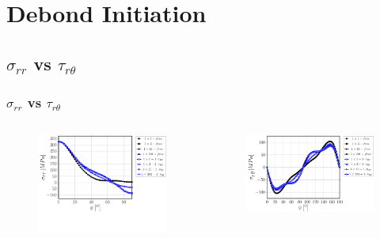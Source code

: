 \documentclass[first,firstsupp,lastsupp,last,hyperref,table]{ETHclass}
\begin{document}
\section{Debond Initiation}

\subsection{$\sigma_{rr}$ vs $\tau_{r\theta}$}

\begin{frame}
\frametitle{\vspace{0.2cm}\small $\sigma_{rr}$ vs $\tau_{r\theta}$}
\vspace{-.75cm}
\centering
\begin{columns}[c]
\centering
\begin{column}{0.5\textwidth}
\centering
\begin{figure}
\centering
\includegraphics[width=\columnwidth]{vf60-nodamage-sigmar-notol.pdf}
\end{figure}
\end{column}
\begin{column}{0.5\textwidth}
\centering
\begin{figure}
\centering
\includegraphics[width=\columnwidth]{vf60-nodamage-taurt.pdf}

\end{figure}
\end{column}
\end{columns}
\end{frame}
\end{document}
